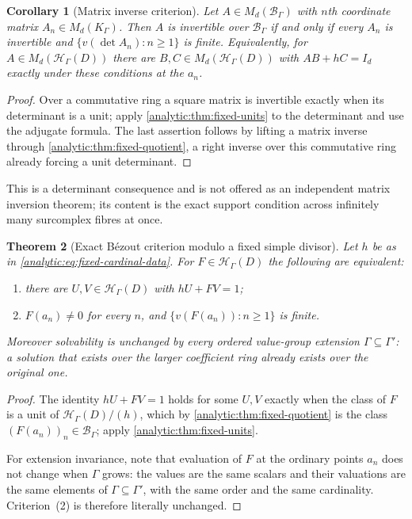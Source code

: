 \documentclass[11pt,letterpaper]{article}
\newtheorem{theorem}{Theorem}[section]
\newtheorem{corollary}[theorem]{Corollary}
\theoremstyle{definition}
\theoremstyle{remark}
\newcommand{\HH}{\mathcal H}
\newcommand{\BB}{\mathcal B}
\numberwithin{equation}{section}
\begin{document}
\begin{corollary}[Matrix inverse criterion]\label{analytic:cor:fixed-matrix}
Let $A\in M_d(\BB_\Gamma)$ with $n$th coordinate matrix
$A_n\in M_d(K_\Gamma)$. Then $A$ is invertible over $\BB_\Gamma$ if and
only if every $A_n$ is invertible and $\{v(\det A_n):n\ge1\}$ is finite.
Equivalently, for $A\in M_d(\HH_\Gamma(D))$ there are
$B,C\in M_d(\HH_\Gamma(D))$ with $AB+hC=I_d$ exactly under these
conditions at the $a_n$.
\end{corollary}
\begin{proof}
Over a commutative ring a square matrix is invertible exactly when its
determinant is a unit; apply \cref{analytic:thm:fixed-units} to the
determinant and use the adjugate formula. The last assertion follows by
lifting a matrix inverse through \cref{analytic:thm:fixed-quotient}, a
right inverse over this commutative ring already forcing a unit
determinant.
\end{proof}

This is a determinant consequence and is not offered as an independent
matrix inversion theorem; its content is the exact support condition across
infinitely many surcomplex fibres at once.

\begin{theorem}[Exact B\'ezout criterion modulo a fixed simple divisor]
\label{analytic:thm:fixed-bezout}
Let $h$ be as in \eqref{analytic:eq:fixed-cardinal-data}. For
$F\in\HH_\Gamma(D)$ the following are equivalent:
\begin{enumerate}
\item there are $U,V\in\HH_\Gamma(D)$ with $hU+FV=1$;
\item $F(a_n)\ne0$ for every $n$, and $\{v(F(a_n)):n\ge1\}$ is finite.
\end{enumerate}
Moreover solvability is unchanged by every ordered value-group extension
$\Gamma\subseteq\Gamma'$: a solution that exists over the larger
coefficient ring already exists over the original one.
\end{theorem}
\begin{proof}
The identity $hU+FV=1$ holds for some $U,V$ exactly when the class of $F$
is a unit of $\HH_\Gamma(D)/(h)$, which by
\cref{analytic:thm:fixed-quotient} is the class $(F(a_n))_n\in\BB_\Gamma$;
apply \cref{analytic:thm:fixed-units}.

For extension invariance, note that evaluation of $F$ at the ordinary
points $a_n$ does not change when $\Gamma$ grows: the values are the same
scalars and their valuations are the same elements of $\Gamma\subseteq
\Gamma'$, with the same order and the same cardinality. Criterion~(2) is
therefore literally unchanged.
\end{proof}
\end{document}
